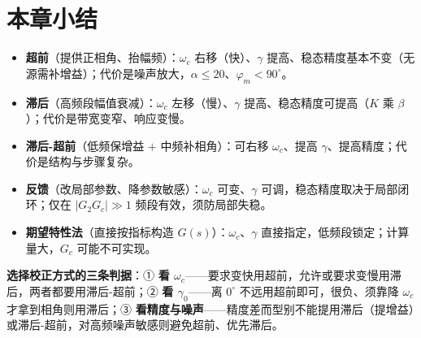 \section{本章小结}
\begin{itemize}
    \item \textbf{超前}（提供正相角、抬幅频）：$\omega_c$ 右移（快）、$\gamma$ 提高、稳态精度基本不变（无源需补增益）；代价是噪声放大，$\alpha\le20$、$\varphi_m<90^\circ$。
    \item \textbf{滞后}（高频段幅值衰减）：$\omega_c$ 左移（慢）、$\gamma$ 提高、稳态精度可提高（$K$ 乘 $\beta$）；代价是带宽变窄、响应变慢。
    \item \textbf{滞后-超前}（低频保增益 $+$ 中频补相角）：可右移 $\omega_c$、提高 $\gamma$、提高精度；代价是结构与步骤复杂。
    \item \textbf{反馈}（改局部参数、降参数敏感）：$\omega_c$ 可变、$\gamma$ 可调，稳态精度取决于局部闭环；仅在 $|G_2G_c|\gg1$ 频段有效，须防局部失稳。
    \item \textbf{期望特性法}（直接按指标构造 $G(s)$）：$\omega_c$、$\gamma$ 直接指定，低频段锁定；计算量大，$G_c$ 可能不可实现。
\end{itemize}

\noindent\textbf{选择校正方式的三条判据}：① \textbf{看 $\omega_c$}——要求变快用超前，允许或要求变慢用滞后，两者都要用滞后-超前；② \textbf{看 $\gamma_0$}——离 $0^\circ$ 不远用超前即可，很负、须靠降 $\omega_c$ 才拿到相角则用滞后；③ \textbf{看精度与噪声}——精度差而型别不能提用滞后（提增益）或滞后-超前，对高频噪声敏感则避免超前、优先滞后。

\bigskip

\setlength{\parskip}{0pt plus 1pt}
\renewcommand{\arraystretch}{1}
\setlength{\tabcolsep}{6pt}
